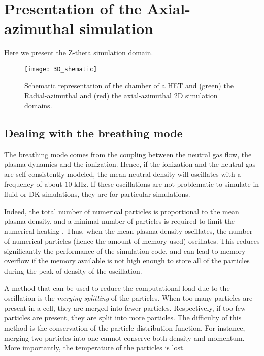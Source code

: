 
\section{Presentation of the Axial-azimuthal simulation}


Here we present the Z-theta simulation domain.


\begin{figure}[hbtp]
  \centering
  \texttt{[image: 3D\_shematic]}
  \caption{Schematic representation of the chamber of a \ac{HET} and (green) the Radial-azimuthal and (red) the axial-azimuthal 2D simulation domains.}
  \label{fig-3Dschematic}
\end{figure}

\subsection{Dealing with the breathing mode} \label{subsec-breathmod}
The breathing mode comes from the coupling between the neutral gas flow, the plasma dynamics and the ionization.
Hence, if the ionization and the neutral gas are self-consistently modeled, the mean neutral density will oscillates with a frequency of about $10$ kHz.
If these oscillations are not problematic to simulate in fluid or \ac{DK} simulations, they are for particular simulations.

Indeed, the total number of numerical particles is proportional to the mean plasma density, and a minimal number of particles is required to limit the numerical heating \citep{turner2006}.
Thus, when the mean plasma density oscillates, the number of numerical particles (hence the amount of memory used) oscillates.
This reduces significantly the performance of the simulation code, and can lead to memory overflow if the memory available is not high enough to store all of the particles during the peak of density  of the oscillation.

A method that can be used to reduce the computational load due to the oscillation is the \emph{merging-splitting} of the particles.
When too many particles are present in a cell, they are merged into fewer particles.
Respectively, if too few particles are present, they are split into more particles.
The difficulty of this method is the conservation of the particle distribution function.
For instance, merging two particles into one cannot conserve both density and momentum.
More importantly, the temperature of the particles is lost.

